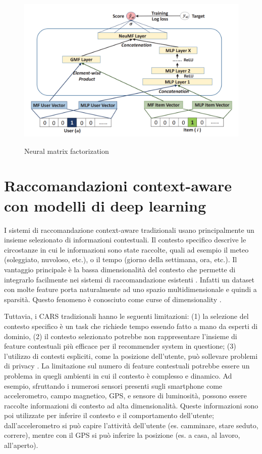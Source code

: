 \begin{figure}
  \centering
  \includegraphics[width=\linewidth]{immagini/neumf.png}
  \caption{Neural matrix factorization}
  \cite{NCF}
  \label{fig:neumf}
\end{figure}

\section{Raccomandazioni context-aware con modelli di deep learning}
I sistemi di raccomandazione context-aware tradizionali usano principalmente un insieme selezionato di informazioni contestuali. Il contesto specifico descrive le circostanze in cui le informazioni sono state raccolte, quali ad esempio il meteo (soleggiato, nuvoloso, etc.), o il tempo (giorno della settimana, ora, etc.). Il vantaggio principale è la bassa dimensionalità del contesto che permette di integrarlo facilmente nei sistemi di raccomandazione esistenti \cite{context-aware-deep-learning}. Infatti un dataset con molte feature porta naturalmente ad uno spazio multidimensionale e quindi a sparsità. Questo fenomeno è conosciuto come curse of dimensionality \cite{curse-of-dim-CARS}.

Tuttavia, i CARS tradizionali hanno le seguenti limitazioni: (1) la selezione del contesto specifico è un task che richiede tempo essendo fatto a mano da esperti di dominio, (2) il contesto selezionato potrebbe non rappresentare l'insieme di feature contestuali più efficace per il recommender system in questione; (3) l'utilizzo di contesti espliciti, come la posizione dell'utente, può sollevare problemi di privacy  \cite{context-aware-deep-learning}. La limitazione sul numero di feature contestuali potrebbe essere un problema in quegli ambienti in cui il contesto è complesso e dinamico. Ad esempio, sfruttando i numerosi sensori presenti sugli smartphone come accelerometro, campo magnetico, GPS, e sensore di luminosità, possono essere raccolte informazioni di contesto ad alta dimensionalità. Queste informazioni sono poi utilizzate per inferire il contesto e il comportamento dell'utente; dall'accelerometro si può capire l'attività dell'utente (es. camminare, stare seduto, correre), mentre con il GPS si può inferire la posizione (es. a casa, al lavoro, all'aperto).

